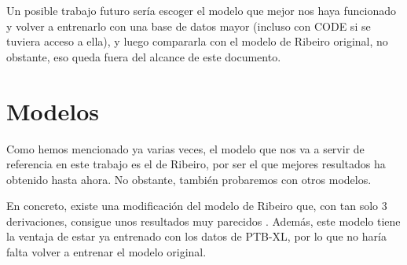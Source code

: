 Un posible trabajo futuro sería escoger el modelo que mejor nos haya funcionado y volver a entrenarlo con una base de datos mayor (incluso con CODE si se tuviera acceso a ella), y luego compararla con el modelo de Ribeiro original, no obstante, eso queda fuera del alcance de este documento.

\section{Modelos}
Como hemos mencionado ya varias veces, el modelo que nos va a servir de referencia en este trabajo es el de Ribeiro, por ser el que mejores resultados ha obtenido hasta ahora. No obstante, también probaremos con otros modelos.

En concreto, existe una modificación del modelo de Ribeiro que, con tan solo 3 derivaciones, consigue unos resultados muy parecidos \citep{TFGSergio}. Además, este modelo tiene la ventaja de estar ya entrenado con los datos de PTB-XL, por lo que no haría falta volver a entrenar el modelo original.